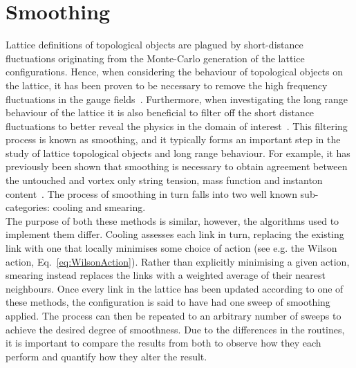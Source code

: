 
\chapter{Smoothing}\label{chapter:Smoothing}
\ifpdf
    \graphicspath{{Chapter5/Figs/Raster/}{Chapter5/Figs/PDF/}{Chapter5/Figs/}}
\else
    \graphicspath{{Chapter5/Figs/Vector/}{Chapter5/Figs/}}
\fi

Lattice definitions of topological objects are plagued by short-distance fluctuations originating from the Monte-Carlo generation of the lattice configurations. Hence, when considering the behaviour of topological objects on the lattice, it has been proven to be necessary to remove the high frequency fluctuations in the gauge fields~\cite{Bonnet:2000dc}. Furthermore, when investigating the long range behaviour of the lattice it is also beneficial to filter off the short distance fluctuations to better reveal the physics in the domain of interest~\cite{Moran:2008ra}. This filtering process is known as smoothing, and it typically forms an important step in the study of lattice topological objects and long range behaviour. For example, it has previously been shown that smoothing is necessary to obtain agreement between the untouched and vortex only string tension, mass function and instanton content~\cite{Trewartha:2015ida,Trewartha:2015nna,Trewartha:2017ive}. The process of smoothing in turn falls into two well known sub-categories: cooling and smearing.\\

The purpose of both these methods is similar, however, the algorithms used to implement them differ. Cooling assesses each link in turn, replacing the existing link with one that locally minimises some choice of action (see e.g. the Wilson action, Eq.~\eqref{eq:WilsonAction}). Rather than explicitly minimising a given action, smearing  instead replaces the links with a weighted average of their nearest neighbours. Once every link in the lattice has been updated according to one of these methods, the configuration is said to have had one sweep of smoothing applied. The process can then be repeated to an arbitrary number of sweeps to achieve the desired degree of smoothness.  Due to the differences in the routines, it is important to compare the results from both to observe how they each perform and quantify how they alter the result.

